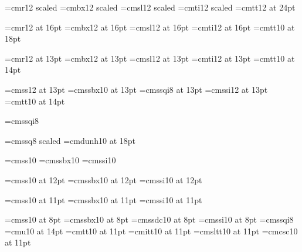 
\newcount\sectionno{}
\newcount\subsectionno{}
\newcount\subsubsectionno{}
\newcount\subsubsubsectionno{}
\newcount\topicno{}

\font\titlerm=cmr12  scaled   \font\titlebf=cmbx12 scaled 
\font\titlesl=cmsl12 scaled   \font\titleit=cmti12 scaled 
\font\titlett=cmtt12 at 24pt

\font\sectionrm=cmr12  at 16pt         \font\sectionbf=cmbx12 at 16pt
\font\sectionsl=cmsl12 at 16pt         \font\sectionit=cmti12 at 16pt
\font\sectiontt=cmtt10 at 18pt

\font\subsectionrm=cmr12 at 13pt       \font\subsectionbf=cmbx12 at 13pt
\font\subsectionsl=cmsl12  at 13pt     \font\subsectionit=cmti12 at 13pt
\font\subsectiontt=cmtt10 at 14pt

\font\subsubsectionrm=cmss12 at 13pt       \font\subsubsectionbf=cmssbx10 at 13pt
\font\subsubsectionsl=cmssqi8 at 13pt      \font\subsubsectionit=cmssi12 at 13pt
\font\subsubsectiontt=cmtt10 at 14pt

\font\quoterm=cmssqi8

\font\bigbf=cmssq8 scaled 
\font\bigcaps=cmdunh10 at 18pt

\font\tenss=cmss10
\font\tenssb=cmssbx10
\font\tenssi=cmssi10

\font\twelvess=cmss10 at 12pt
\font\twelvessb=cmssbx10 at 12pt
\font\twelvessi=cmssi10 at 12pt

\font\elevenss=cmss10 at 11pt
\font\elevenssb=cmssbx10 at 11pt
\font\elevenssi=cmssi10 at 11pt

\font\eightss=cmss10 at 8pt
\font\eightssb=cmssbx10 at 8pt
\font\eightssdb=cmssdc10 at 8pt
\font\eightssi=cmssi10 at 8pt
\font\eightssqi=cmssqi8
\font\tenfunky=cmu10 at 14pt
\font\bodytt=cmtt10 at 11pt
\font\bodytti=cmitt10 at 11pt
\font\bodyttsl=cmsltt10 at 11pt
\font\bodyttsc=cmcsc10 at 11pt
\def\tt{\fam\ttfam\bodytt}
\def\ttsl{\fam\ttfam\bodyttsl}
\def\tti{\fam\ttfam\bodytti}
\def\ttsc{\fam\ttfam\bodyttsc}

%
%

\def\title#1\par{
\vfil\break{
    \let\rm\titlerm\let\bf\titlebf
    \let\tt\titlett
    \let\it\titleit
    \let\sl\titlesl\rm
    {\bigskip\titlestyle{#1}\smallskip\hrule\hrule}}}


